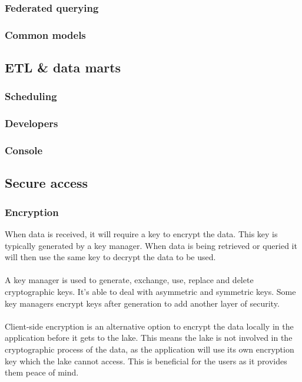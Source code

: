 \documentclass[10pt]{article}
\begin{document}
\subsubsection{Federated querying}
\subsubsection{Common models}

\subsection{ETL \& data marts}
\subsubsection{Scheduling}
\subsubsection{Developers}
\subsubsection{Console}

\subsection{Secure access}
\subsubsection{Encryption}

When data is received, it will require a key to encrypt the data. This key is typically generated by a key manager. When data is being retrieved or queried it will then use the same key to decrypt the data to be used.
\\ \\
A key manager is used to generate, exchange, use, replace and delete cryptographic keys. It's able to deal with asymmetric and symmetric keys. Some key managers encrypt keys after generation to add another layer of security.
\\ \\
Client-side encryption is an alternative option to encrypt the data locally in the application before it gets to the lake. This means the lake is not involved in the cryptographic process of the data, as the application will use its own encryption key which the lake cannot access. This is beneficial for the users as it provides them peace of mind.
\end{document}
